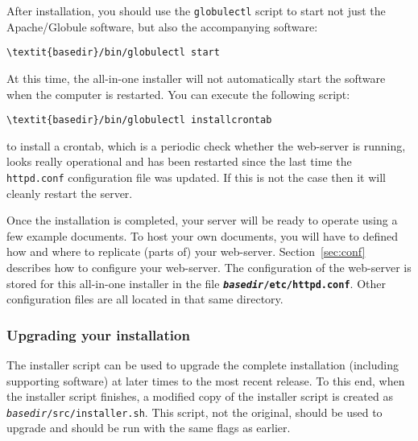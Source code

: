 \documentclass[10pt,a4paper]{article}
\makeatletter
\newenvironment{p}{\@open{P}{}}{\@close{P}}
\newenvironment{p}{}{\par}
\makeatother
\begin{document}
\begin{p}
After installation, you should use the \texttt{globulectl} script to start not
just the Apache/Globule software, but also the accompanying software:
\end{p}

\begin{Verbatim}
\textit{basedir}/bin/globulectl start
\end{Verbatim}

\begin{p}
At this time, the all-in-one installer will not automatically start the
software when the computer is restarted.  You can execute the following
script:
\end{p}

\begin{Verbatim}
\textit{basedir}/bin/globulectl installcrontab
\end{Verbatim}

\begin{p}
to install a crontab, which is a periodic check whether the web-server is
running, looks really operational and has been restarted since the last time
the \verb!httpd.conf! configuration file was updated.  If this is not the case
then it will cleanly restart the server.
\end{p}

\begin{p}
Once the installation is completed, your server will be ready to operate using
a few example documents.  To host your own documents, you will have to defined
how and where to replicate (parts of) your web-server.  Section~\ref{sec:conf}
describes how to configure your web-server.  The configuration of the
web-server is stored for this all-in-one installer in the file
\textbf{\texttt{\textit{basedir}/etc/httpd.conf}}.  Other configuration files
are all located in that same directory.
\end{p}

\subsubsection*{Upgrading your installation}

\begin{p}
The installer script can be used to upgrade the complete installation
(including supporting software) at later times to the most recent release.  To
this end, when the installer script finishes, a modified copy of the installer
script is created as \texttt{\textit{basedir}/src/installer.sh}.  This script,
not the original, should be used to upgrade and should be run with the same
flags as earlier.
\end{p}
\end{document}
